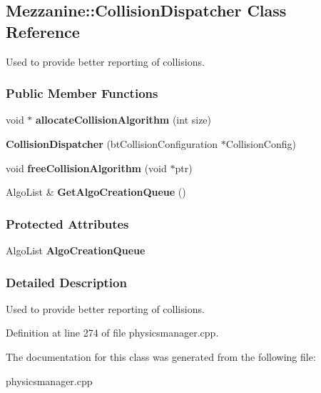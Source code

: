 \hypertarget{classMezzanine_1_1CollisionDispatcher}{
\subsection{Mezzanine::CollisionDispatcher Class Reference}
\label{classMezzanine_1_1CollisionDispatcher}
}


Used to provide better reporting of collisions.  


\subsubsection*{Public Member Functions}
\begin{DoxyCompactItemize}
\item 
\hypertarget{classMezzanine_1_1CollisionDispatcher_ae384ed995cba028d6e7bd57098d2f67d}{
void $\ast$ {\bfseries allocateCollisionAlgorithm} (int size)}
\label{classMezzanine_1_1CollisionDispatcher_ae384ed995cba028d6e7bd57098d2f67d}

\item 
\hypertarget{classMezzanine_1_1CollisionDispatcher_a9aa6ea6e6c0aaa308a5693062ccf6568}{
{\bfseries CollisionDispatcher} (btCollisionConfiguration $\ast$CollisionConfig)}
\label{classMezzanine_1_1CollisionDispatcher_a9aa6ea6e6c0aaa308a5693062ccf6568}

\item 
\hypertarget{classMezzanine_1_1CollisionDispatcher_a7f5296daba765a8b1c258239f519c021}{
void {\bfseries freeCollisionAlgorithm} (void $\ast$ptr)}
\label{classMezzanine_1_1CollisionDispatcher_a7f5296daba765a8b1c258239f519c021}

\item 
\hypertarget{classMezzanine_1_1CollisionDispatcher_accdd6570d86d41be9bc1672254d15ff9}{
AlgoList \& {\bfseries GetAlgoCreationQueue} ()}
\label{classMezzanine_1_1CollisionDispatcher_accdd6570d86d41be9bc1672254d15ff9}

\end{DoxyCompactItemize}
\subsubsection*{Protected Attributes}
\begin{DoxyCompactItemize}
\item 
\hypertarget{classMezzanine_1_1CollisionDispatcher_a124864848dcdbf42a92b45b3cca2137e}{
AlgoList {\bfseries AlgoCreationQueue}}
\label{classMezzanine_1_1CollisionDispatcher_a124864848dcdbf42a92b45b3cca2137e}

\end{DoxyCompactItemize}


\subsubsection{Detailed Description}
Used to provide better reporting of collisions. 

Definition at line 274 of file physicsmanager.cpp.



The documentation for this class was generated from the following file:\begin{DoxyCompactItemize}
\item 
physicsmanager.cpp\end{DoxyCompactItemize}
